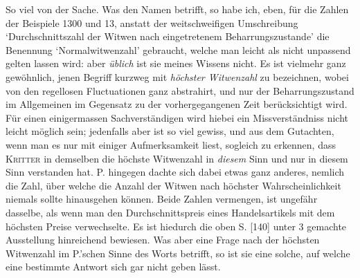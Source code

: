 So viel von der Sache. Was den Namen betrifft, so habe ich, eben, für die Zahlen der Beispiele 1300 und 13, anstatt der weitschweifigen Umschreibung ‘Durchschnittszahl der Witwen nach eingetretenem Beharrungszustande’ die Benennung ‘Normalwitwenzahl’ gebraucht, welche man leicht als nicht unpassend gelten lassen wird: aber \textit{üblich} ist sie meines Wissens nicht. Es ist vielmehr ganz gewöhnlich, jenen Begriff kurzweg mit \textit{höchster Witwenzahl} zu bezeichnen, wobei von den regellosen Fluctuationen ganz abstrahirt, und nur der Beharrungszustand im Allgemeinen im Gegensatz zu der vorhergegangenen Zeit berücksichtigt wird. Für einen einigermassen Sachverständigen wird hiebei ein Missverständniss nicht leicht möglich sein; jedenfalls aber ist so viel gewiss, und aus dem Gutachten, wenn man es nur mit einiger Aufmerksamkeit liest, sogleich zu erkennen, dass \textsc{Kritter} in demselben die höchste Witwenzahl in \textit{diesem} Sinn und nur in diesem Sinn verstanden hat. P. hingegen dachte sich dabei etwas ganz anderes, nemlich die Zahl, über welche die Anzahl der Witwen nach höchster Wahrscheinlichkeit niemals sollte hinausgehen können. Beide Zahlen vermengen, ist ungefähr dasselbe, als wenn man den Durchschnittspreis eines Handelsartikels mit dem höchsten Preise verwechselte. Es ist hiedurch die oben S. [140] unter 3 gemachte Ausstellung hinreichend bewiesen. Was aber eine Frage nach der höchsten Witwenzahl im P.’schen Sinne des Worts betrifft, so ist sie eine solche, auf welche eine bestimmte Antwort sich gar nicht geben lässt.
